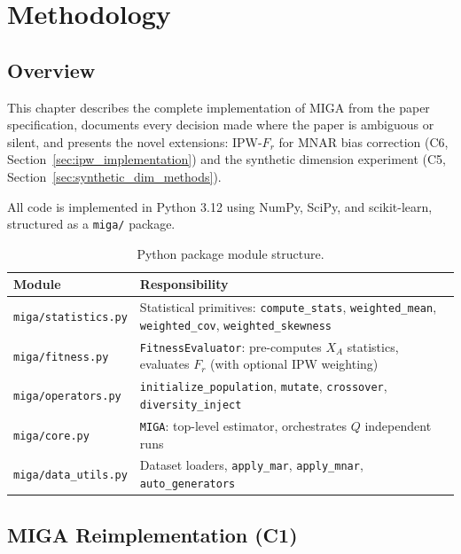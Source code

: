 
\chapter{Methodology}
\label{Chapter3}

\section{Overview}

This chapter describes the complete implementation of MIGA from the paper specification, documents every decision made where the paper is ambiguous or silent, and presents the novel extensions: IPW-$F_r$ for MNAR bias correction (C6, Section~\ref{sec:ipw_implementation}) and the synthetic dimension experiment (C5, Section~\ref{sec:synthetic_dim_methods}).

All code is implemented in Python 3.12 using NumPy, SciPy, and scikit-learn, structured as a \texttt{miga/} package.

\begin{table}[h]
\caption{Python package module structure.}
\label{tab:modules}
\centering
\begin{tabular}{lp{9.5cm}}
\toprule
\textbf{Module} & \textbf{Responsibility} \\
\midrule
\texttt{miga/statistics.py} & Statistical primitives: \texttt{compute\_stats}, \texttt{weighted\_mean}, \texttt{weighted\_cov}, \texttt{weighted\_skewness} \\
\texttt{miga/fitness.py}    & \texttt{FitnessEvaluator}: pre-computes $X_A$ statistics, evaluates $F_r$ (with optional IPW weighting) \\
\texttt{miga/operators.py}  & \texttt{initialize\_population}, \texttt{mutate}, \texttt{crossover}, \texttt{diversity\_inject} \\
\texttt{miga/core.py}       & \texttt{MIGA}: top-level estimator, orchestrates $Q$ independent runs \\
\texttt{miga/data\_utils.py}& Dataset loaders, \texttt{apply\_mar}, \texttt{apply\_mnar}, \texttt{auto\_generators} \\
\bottomrule
\end{tabular}
\end{table}

\section{MIGA Reimplementation (C1)}

